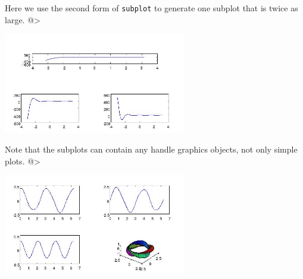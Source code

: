 Here we use the second form of \verb|subplot| to generate one subplot
that is twice as large.
@>


\centerline{\includegraphics[width=8cm]{subplot2}}

Note that the subplots can contain any handle graphics objects,
not only simple plots.
@>


\centerline{\includegraphics[width=8cm]{subplot3}}

